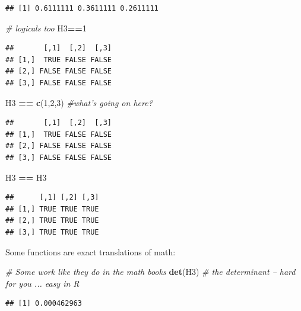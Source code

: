\documentclass[]{article}
\newenvironment{Shaded}{\begin{snugshade}}{\end{snugshade}}
\newcommand{\KeywordTok}[1]{\textcolor[rgb]{0.13,0.29,0.53}{\textbf{#1}}}
\newcommand{\DecValTok}[1]{\textcolor[rgb]{0.00,0.00,0.81}{#1}}
\newcommand{\StringTok}[1]{\textcolor[rgb]{0.31,0.60,0.02}{#1}}
\newcommand{\CommentTok}[1]{\textcolor[rgb]{0.56,0.35,0.01}{\textit{#1}}}
\newcommand{\OperatorTok}[1]{\textcolor[rgb]{0.81,0.36,0.00}{\textbf{#1}}}
\newcommand{\NormalTok}[1]{#1}
\begin{document}
\begin{verbatim}
## [1] 0.6111111 0.3611111 0.2611111
\end{verbatim}

\begin{Shaded}
\begin{Highlighting}[]
\CommentTok{# logicals too}
\NormalTok{H3}\OperatorTok{==}\DecValTok{1}
\end{Highlighting}
\end{Shaded}

\begin{verbatim}
##       [,1]  [,2]  [,3]
## [1,]  TRUE FALSE FALSE
## [2,] FALSE FALSE FALSE
## [3,] FALSE FALSE FALSE
\end{verbatim}

\begin{Shaded}
\begin{Highlighting}[]
\NormalTok{H3 }\OperatorTok{==}\StringTok{ }\KeywordTok{c}\NormalTok{(}\DecValTok{1}\NormalTok{,}\DecValTok{2}\NormalTok{,}\DecValTok{3}\NormalTok{) }\CommentTok{#what's going on here?}
\end{Highlighting}
\end{Shaded}

\begin{verbatim}
##       [,1]  [,2]  [,3]
## [1,]  TRUE FALSE FALSE
## [2,] FALSE FALSE FALSE
## [3,] FALSE FALSE FALSE
\end{verbatim}

\begin{Shaded}
\begin{Highlighting}[]
\NormalTok{H3 }\OperatorTok{==}\StringTok{ }\NormalTok{H3}
\end{Highlighting}
\end{Shaded}

\begin{verbatim}
##      [,1] [,2] [,3]
## [1,] TRUE TRUE TRUE
## [2,] TRUE TRUE TRUE
## [3,] TRUE TRUE TRUE
\end{verbatim}

Some functions are exact translations of math:

\begin{Shaded}
\begin{Highlighting}[]
\CommentTok{# Some work like they do in the math books}
\KeywordTok{det}\NormalTok{(H3) }\CommentTok{# the determinant -- hard for you ... easy in R}
\end{Highlighting}
\end{Shaded}

\begin{verbatim}
## [1] 0.000462963
\end{verbatim}
\end{document}
